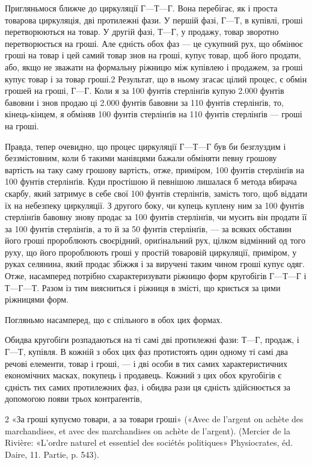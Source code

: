 Пригляньмося ближче до циркуляції $Г — Т — Г$. Вона перебігає,
як і проста товарова циркуляція, дві протилежні фази.
У першій фазі, $Г — Т$, в купівлі, гроші перетворюються на товар.
У другій фазі, $Т — Г$, у продажу, товар зворотно перетворюється
на гроші. Але єдність обох фаз — це сукупний рух, що
обмінює гроші на товар і цей самий товар знов на гроші, купує
товар, щоб його продати, або, якщо не зважати на формальну
ріжницю між купівлею і продажем, за гроші купує товар і за
товар гроші.2 Результат, що в ньому згасає цілий процес, є
обмін грошей на гроші, $Г — Г$. Коли я за 100 фунтів стерлінґів
купую 2.000 фунтів бавовни і знов продаю ці 2.000 фунтів
бавовни за 110 фунтів стерлінґів, то, кінець-кінцем, я
обміняв 100 фунтів стерлінґів на 110 фунтів стерлінґів — гроші
на гроші.

Правда, тепер очевидно, що процес циркуляції $Г — Т — Г$
був би безглуздим і беззмістовним, коли б такими манівцями
бажали обміняти певну грошову вартість на таку саму грошову
вартість, отже, приміром, 100 фунтів стерлінґів на 100 фунтів
стерлінґів. Куди простішою й певнішою лишалася б метода
вбирача скарбу, який затримує в себе свої 100 фунтів стерлінґів,
замість того, щоб віддати їх на небезпеку циркуляції. З другого
боку, чи купець куплену ним за 100 фунтів стерлінґів бавовну
знову продає за 100 фунтів стерлінґів, чи мусить він продати її за
100 фунтів стерлінґів, а то й за 50 фунтів стерлінґів, — за всяких
обставин його гроші пророблюють своєрідний, ориґінальний
рух, цілком відмінний од того руху, що його пророблюють
гроші у простій товаровій циркуляції, приміром, у руках селянина,
який продає збіжжя і за виручені таким чином гроші
купує одяг. Отже, насамперед потрібно схарактеризувати ріжницю
форм кругобігів $Г — Т — Г$ і $Т — Г — Т$. Разом із тим
виясниться і ріжниця в змісті, що криється за цими ріжницями
форм.

Погляньмо насамперед, що є спільного в обох цих формах.

Обидва кругобіги розпадаються на ті самі дві протилежні
фази: $Т — Г$, продаж, і $Г — Т$, купівля. В кожній з обох цих
фаз протистоять один одному ті самі два речові елементи, товар
і гроші, — і дві особи в тих самих характеристичних економічних
масках, покупець і продавець. Кожний з цих обох кругобігів
є єдність тих самих протилежних фаз, і обидва рази ця
єдність здійснюється за допомогою появи трьох контраґентів,

2 «За гроші купуємо товари, а за товари гроші» («Avec de l’argent
on achète des marchandises, et avec des marchandises on achète de l’argent).
(Mercier de la Rivière: «L’ordre naturel et essentiel des sociétés
politiques» Physiocrates, éd. Daire, 11. Partie, p. 543).
\parbreak{}  %
